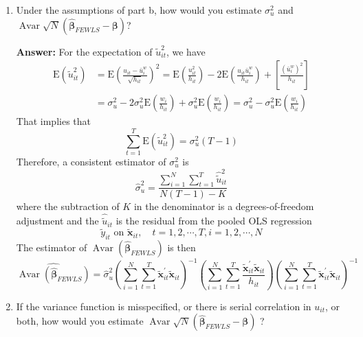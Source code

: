 \begin{enumerate}
\begin{enumerate}
        \item Under the assumptions of part b, how would you estimate $\sigma_{u}^{2}$ and $\operatorname{Avar}\sqrt{N}\left(\hat{\boldsymbol{\beta}}_{F E W L S}-\boldsymbol{\beta}\right)$?
        
        \textbf{Answer:} For the expectation of $\tilde{u}_{it}^2$, we have
        \begin{align*}
            \mathrm{E}\left( \tilde{u}_{it}^2 \right) &= \mathrm{E}\left(  \frac{u_{it}-\bar{u}_i^w}{\sqrt{h_{it}}} \right)^2 = \mathrm{E}\left( \frac{u_{it}^2}{h_{it}} \right) - 2 \mathrm{E}\left(\frac{u_{it}\bar{u}_i^w}{h_{it}}\right) + \left[\frac{(\bar{u}_i^w)^2}{h_{it}}\right] \\
            &= \sigma_u^2 - 2\sigma_u^2 \mathrm{E}\left( \frac{w_i}{h_{it}} \right) + \sigma_u^2 \mathrm{E}\left( \frac{w_i}{h_{it}} \right) = \sigma_u^2 - \sigma_u^2 \mathrm{E}\left( \frac{w_i}{h_{it}} \right)
        \end{align*}
        That implies that
        \[ \sum_{t=1}^T \mathrm{E}\left( \tilde{u}_{it}^2 \right) = \sigma_u^2(T-1) \]
        Therefore, a consistent estimator of $\sigma_u^2$ is
        \[ \hat{\sigma}_u^2 = \frac{ \displaystyle\sum_{i=1}^N\sum_{t=1}^T \hat{\tilde{u}}_{it}^2 }{N(T-1) - K} \]
        where the subtraction of $K$ in the denominator is a degrees-of-freedom adjustment and the $\hat{\tilde{u}}_{it}$ is the residual from the pooled OLS regression
        \[ \tilde{y}_{it} \text{ on } \tilde{\mathbf{x}}_{it},\quad t = 1,2,\cdots,T, i = 1,2,\cdots,N \]
        The estimator of $\operatorname{Avar} \left( \hat{\bm{\beta}}_{FEWLS} \right)$ is then
        \[ \widehat{\operatorname{Avar} \left( \hat{\bm{\beta}}_{FEWLS} \right)} = \hat{\sigma}_u^2 \left( \sum_{i=1}^N\sum_{t=1}^{T} \tilde{\mathbf{x}}_{i t}^{\prime} \tilde{\mathbf{x}}_{i t} \right)^{-1} \left( \sum_{i=1}^N\sum_{t=1}^T \frac{\tilde{\mathbf{x}}_{i t}^{\prime} \tilde{\mathbf{x}}_{i t}}{h_{i t}} \right) \left( \sum_{i=1}^N\sum_{t=1}^{T} \tilde{\mathbf{x}}_{i t}^{\prime} \tilde{\mathbf{x}}_{i t} \right)^{-1} \]
        
        \item If the variance function is misspecified, or there is serial correlation in $u_{i t}$, or both, how would you estimate $\displaystyle\operatorname{Avar} \sqrt{N}\left(\hat{\boldsymbol{\beta}}_{F E W L S}-\boldsymbol{\beta}\right)$ ?
        

\end{enumerate}
\end{enumerate}
